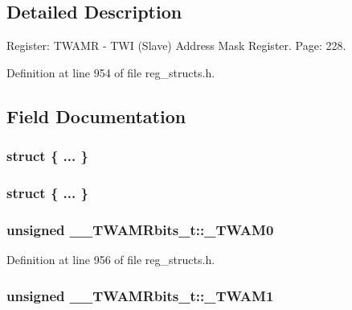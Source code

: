 \subsection{Detailed Description}
Register\+: T\+W\+A\+M\+R -\/ T\+W\+I (Slave) Address Mask Register. Page\+: 228. 

Definition at line 954 of file reg\+\_\+structs.\+h.



\subsection{Field Documentation}
\hypertarget{union_____t_w_a_m_rbits__t_ae0f1ec63f4864c393420ebb721092588}{\subsubsection[{"@233}]{\setlength{\rightskip}{0pt plus 5cm}struct \{ ... \} }}\label{union_____t_w_a_m_rbits__t_ae0f1ec63f4864c393420ebb721092588}
\hypertarget{union_____t_w_a_m_rbits__t_aeec11bafb2798af51137c5789f0a5801}{\subsubsection[{"@235}]{\setlength{\rightskip}{0pt plus 5cm}struct \{ ... \} }}\label{union_____t_w_a_m_rbits__t_aeec11bafb2798af51137c5789f0a5801}
\hypertarget{union_____t_w_a_m_rbits__t_a71109f333587be8e0f9852d54b33d887}{
\subsubsection[{\+\_\+\+T\+W\+A\+M0}]{\setlength{\rightskip}{0pt plus 5cm}unsigned \+\_\+\+\_\+\+T\+W\+A\+M\+Rbits\+\_\+t\+::\+\_\+\+T\+W\+A\+M0}}\label{union_____t_w_a_m_rbits__t_a71109f333587be8e0f9852d54b33d887}


Definition at line 956 of file reg\+\_\+structs.\+h.

\hypertarget{union_____t_w_a_m_rbits__t_a6cf5c33b2cb3ee7d63b80f7e30876fde}{
\subsubsection[{\+\_\+\+T\+W\+A\+M1}]{\setlength{\rightskip}{0pt plus 5cm}unsigned \+\_\+\+\_\+\+T\+W\+A\+M\+Rbits\+\_\+t\+::\+\_\+\+T\+W\+A\+M1}}\label{union_____t_w_a_m_rbits__t_a6cf5c33b2cb3ee7d63b80f7e30876fde}


